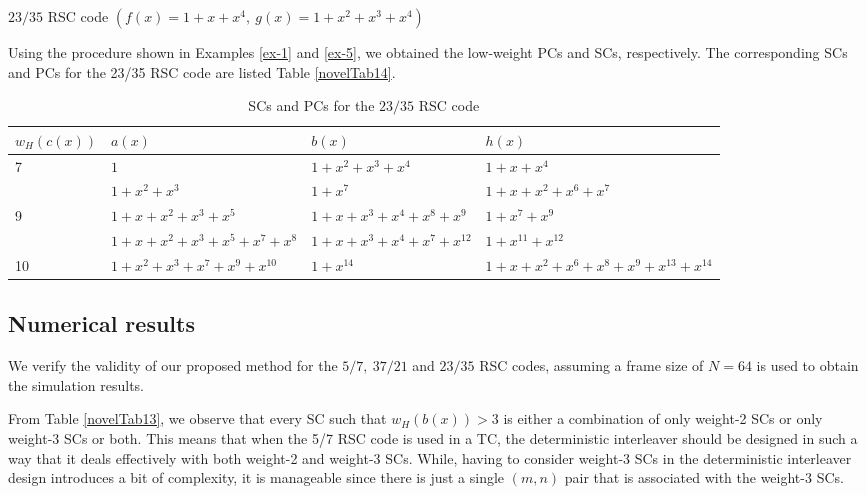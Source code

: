 \begin{example}{$23/35$ RSC code $\left(f(x)=1+x+x^4,~g(x)=1+x^2+x^3+x^4 \right)$}
	
	Using the procedure shown in Examples  \ref{ex-1} and  \ref{ex-5}, we obtained the  low-weight PCs and SCs, respectively.
	The corresponding SCs and PCs  for the 23/35 RSC code are listed Table \ref{novelTab14}.
	\begin{table}[htbp]
		\caption{SCs and PCs for the $23/35$ RSC code}
		\centering
		\begin{tabularx}{0.75\textwidth}{lXlX} 
			\toprule
			$w_H(c(x))$ & $a(x)$ & $b(x)$ & $h(x)$ \\ [0.5ex] 
			\midrule
			7&$1$ & $1+x^2+x^3+x^4$ & $1+x+x^{4}$\\
			\hline
			&$1+x^2+x^3$ & $1+x^7$ & $1+x+x^2+x^6+x^7$\\
			\hline 
			9&$1+x+x^2+x^3+x^5$ & $1+x+x^3+x^4+x^8+x^9$ & $1+x^7+x^9$\\
			\hline
			&$1+x+x^2+x^3+x^5+x^7+x^8$ & $1+x+x^3+x^4+x^7+x^{12}$ & $1+x^{11}+x^{12}$\\
			\hline
			10&$1+x^2+x^3+x^7+x^9+x^{10}$ & $1+x^{14}$ & $1+x+x^2+x^6+x^8+x^9+x^{13}+x^{14}$\\
			\bottomrule
		\end{tabularx}
		
		\label{novelTab15}
	\end{table}
\end{example}

\subsection{Numerical results}
We verify the validity of our proposed method for the $5/7,~37/21$ and $23/35$ RSC codes, assuming a frame size of $N=64$ is used to obtain the simulation results. 



From Table \ref{novelTab13}, we observe that every SC such that $w_H(b(x)) >3$ is either a combination of only weight-2 SCs or only weight-3 SCs or both. This means that when the 5/7 RSC code is used in a TC, the deterministic interleaver should be designed in such a way that it deals effectively with both weight-2 and weight-3 SCs. While, having to consider weight-3 SCs in the deterministic interleaver design introduces a bit of complexity, it is manageable since there is just a single $(m,n)$ pair that is associated with the weight-3 SCs.

